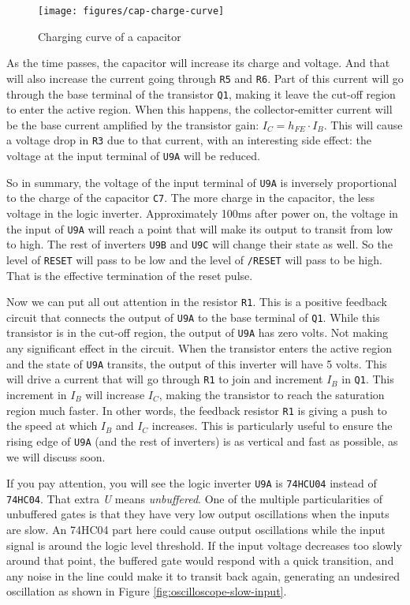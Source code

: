 \begin{figure}[htbp]
  \centering
  \texttt{[image: figures/cap-charge-curve]}
  \caption{Charging curve of a capacitor}
  \label{fig:cap-curves}
\end{figure}

As the time passes, the capacitor will increase its charge and voltage. And that will also increase the current going through {\tt R5} and {\tt R6}. Part of this current will go through the base terminal of the transistor {\tt Q1}, making it leave the cut-off region to enter the active region. When this happens, the collector-emitter current will be the base current amplified by the transistor gain: $I_C = h_{FE} \cdot I_B$. This will cause a voltage drop in {\tt R3} due to that current, with an interesting side effect: the voltage at the input terminal of {\tt U9A} will be reduced.

So in summary, the voltage of the input terminal of {\tt U9A} is inversely proportional to the charge of the capacitor {\tt C7}. The more charge in the capacitor, the less voltage in the logic inverter. Approximately 100ms after power on, the voltage in the input of {\tt U9A} will reach a point that will make its output to transit from low to high. The rest of inverters {\tt U9B} and {\tt U9C} will change their state as well. So the level of {\tt RESET} will pass to be low and the level of {\tt /RESET} will pass to be high. That is the effective termination of the reset pulse.

Now we can put all out attention in the resistor {\tt R1}. This is a positive feedback circuit that connects the output of {\tt U9A} to the base terminal of {\tt Q1}. While this transistor is in the cut-off region, the output of {\tt U9A} has zero volts. Not making any significant effect in the circuit. When the transistor enters the active region and the state of {\tt U9A} transits, the output of this inverter will have 5 volts. This will drive a current that will go through {\tt R1} to join and increment $I_B$ in {\tt Q1}. This increment in $I_B$ will increase $I_C$, making the transistor to reach the saturation region much faster. In other words, the feedback resistor {\tt R1} is giving a push to the speed at which $I_B$ and $I_C$ increases. This is particularly useful to ensure the rising edge of {\tt U9A} (and the rest of inverters) is as vertical and fast as possible, as we will discuss soon.

If you pay attention, you will see the logic inverter {\tt U9A} is {\tt 74HCU04} instead of {\tt 74HC04}. That extra {\it U} means {\it unbuffered}. One of the multiple particularities of unbuffered gates is that they have very low output oscillations when the inputs are slow. An 74HC04 part here could cause output oscillations while the input signal is around the logic level threshold. If the input voltage decreases too slowly around that point, the buffered gate would respond with a quick transition, and any noise in the line could make it to transit back again, generating an undesired oscillation as shown in Figure \ref{fig:oscilloscope-slow-input}.

